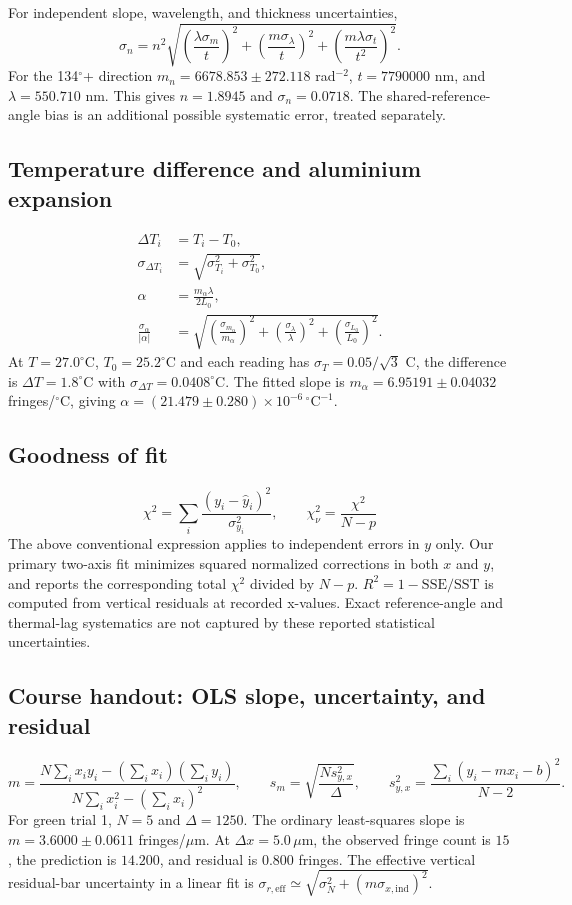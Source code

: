For independent slope, wavelength, and thickness uncertainties,
\[
\sigma_n=n^2\sqrt{\left(\frac{\lambda\sigma_m}{t}\right)^2+
\left(\frac{m\sigma_\lambda}{t}\right)^2+
\left(\frac{m\lambda\sigma_t}{t^2}\right)^2}.
\]
For the 134$^\circ$+ direction $m_n=6678.853\pm272.118$ rad$^{-2}$,
$t=7790000$ nm, and $\lambda=550.710$ nm. This gives $n=1.8945$ and
$\sigma_n=0.0718$. The shared-reference-angle
bias is an additional possible systematic error, treated separately.

\subsection*{Temperature difference and aluminium expansion}
\begin{align*}
\Delta T_i &= T_i-T_0,\\
\sigma_{\Delta T_i}&=\sqrt{\sigma_{T_i}^2+\sigma_{T_0}^2},\\
\alpha &= \frac{m_\alpha\lambda}{2L_0},\\
\frac{\sigma_\alpha}{|\alpha|} &=
\sqrt{\left(\frac{\sigma_{m_\alpha}}{m_\alpha}\right)^2+
\left(\frac{\sigma_\lambda}{\lambda}\right)^2+
\left(\frac{\sigma_{L_0}}{L_0}\right)^2}.
\end{align*}
At $T=27.0^\circ$C, $T_0=25.2^\circ$C and each reading has
$\sigma_T=0.05/\sqrt3$ C, the difference is $\Delta T=1.8^\circ$C with
$\sigma_{\Delta T}=0.0408^\circ$C.
The fitted slope is $m_\alpha=6.95191\pm0.04032$ fringes/$^\circ$C,
giving $\alpha=(21.479\pm0.280)\times10^{-6}\,^\circ\mathrm{C}^{-1}$.

\subsection*{Goodness of fit}
\[
\chi^2=\sum_i\frac{(y_i-\widehat y_i)^2}{\sigma_{y_i}^2},
\qquad \chi^2_\nu=\frac{\chi^2}{N-p}
\]
The above conventional expression applies to independent errors in $y$ only.
Our primary two-axis fit minimizes squared normalized corrections in both
$x$ and $y$, and reports the corresponding total $\chi^2$ divided by $N-p$.
$R^2=1-\mathrm{SSE}/\mathrm{SST}$ is computed from vertical residuals at
recorded x-values. Exact reference-angle and thermal-lag systematics are not
captured by these reported statistical uncertainties.
\subsection*{Course handout: OLS slope, uncertainty, and residual}
\[
m=\frac{N\sum_i x_i y_i-(\sum_i x_i)(\sum_i y_i)}{N\sum_i x_i^2-(\sum_i x_i)^2},\qquad
s_m=\sqrt{\frac{Ns_{y,x}^2}{\Delta}},\qquad
s_{y,x}^2=\frac{\sum_i(y_i-mx_i-b)^2}{N-2}.
\]
For green trial 1, $N=5$ and $\Delta=1250$. The ordinary least-squares slope is $m=3.6000\pm0.0611$ fringes/$\mu$m.
At $\Delta x=5.0\,\mu$m, the observed fringe count is $15$, the prediction is $14.200$, and residual is $0.800$ fringes.
The effective vertical residual-bar uncertainty in a linear fit is $\sigma_{r,\mathrm{eff}}\simeq\sqrt{\sigma_N^2+(m\sigma_{x,\mathrm{ind}})^2}$.

